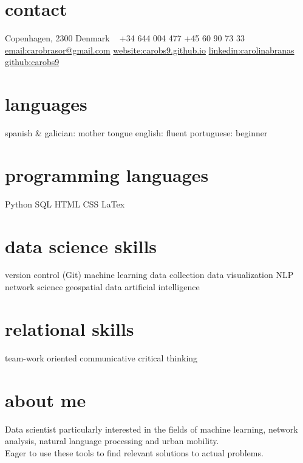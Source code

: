 \documentclass[]{friggeri-cv-a4}
\begin{document}


\begin{aside} %
\section{contact}
Copenhagen,
2300
Denmark
~
+34 644 004 477
+45 60 90 73 33
~
\href{mailto:carobrasor@gmail.com}{email:carobrasor@gmail.com}
\href{https://carobs9.github.io/}{website:carobs9.github.io}
\href{https://www.linkedin.com/in/carolinabranas/}{linkedin:carolinabranas}
\href{https://github.com/carobs9}{github:carobs9}
\section{languages}
spanish \& galician: mother tongue
english: fluent
portuguese: beginner
\section{programming languages}
Python
SQL
HTML
CSS
LaTex
\section{data science skills}
version control (Git)
machine learning
data collection
data visualization
NLP
network science
geospatial data
artificial intelligence
\section{relational skills}
team-work oriented
communicative
critical thinking
\end{aside}


\section{about me}

Data scientist particularly interested in the fields of machine learning, network analysis, natural language processing and urban mobility. \\
Eager to use these tools to find relevant solutions to actual problems.
\end{document}

